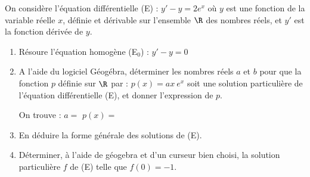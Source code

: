 On considère l’équation différentielle (E) : $y' - y = 2e^{x}$ où $y$ est une fonction de la variable réelle $x$, définie et dérivable sur l’ensemble $\R$ des nombres réels, et $y'$ est la fonction dérivée de $y$.

\begin{enumerate}
	\item Résoure l'équation homogène (E$_0$) : $y'-y=0$\sautp

	\item A l’aide du logiciel Géogébra, déterminer les nombres réels $a$ et $b$ pour que la fonction $p$ définie sur $\R$ par : $p(x) = ax~e^{x}$ soit une solution particulière de l'équation différentielle (E), et donner l’expression de $p$. \sautm
	
	On trouve : $a=$\makebox[0.1\linewidth]{\dotfill} \hfill $p(x)=$\makebox[0.3\linewidth]{\dotfill}\sauts
	\item En déduire la forme générale des solutions de (E).\sautp

	\item Déterminer, à l'aide de géogebra et d'un curseur bien choisi, la solution particulière $f$ de (E) telle que $f(0)=-1$.\sautp

\end{enumerate}
